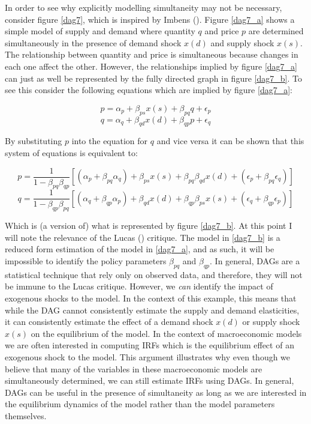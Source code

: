 \documentclass{article}
\begin{document}
In order to see why explicitly modelling simultaneity may not be necessary, consider figure \ref{dag7}, which is inspired by Imbens (\citeyear{imbens2019potential}). Figure \ref{dag7_a} shows a simple model of supply and demand where quantity $q$ and price $p$ are determined simultaneously in the presence of demand shock $x(d)$ and supply shock $x(s)$. The relationship between quantity and price is simultaneous because changes in each one affect the other. However, the relationships implied by figure \ref{dag7_a} can just as well be represented by the fully directed graph in figure \ref{dag7_b}. To see this consider the following equations which are implied by figure \ref{dag7_a}:

\begin{equation}
  p = \alpha_p + \beta_{ps} x(s) + \beta_{pq} q + \epsilon_{p}
\end{equation}
\begin{equation}
  q = \alpha_q + \beta_{qd} x(d) + \beta_{qp} p + \epsilon_{q}
\end{equation}

By substituting $p$ into the equation for $q$ and vice versa it can be shown that this system of equations is equivalent to:

\begin{equation}
  \label{price_eq}
  p = \frac{1}{1-\beta_{pq}\beta_{qp}}[(\alpha_p + \beta_{pq} \alpha_q) + \beta_{ps} x(s) + \beta_{pq} \beta_{qd} x(d) + (\epsilon_p + \beta_{pq} \epsilon_q)]
\end{equation}
\begin{equation}
  \label{quantity_eq}
  q = \frac{1}{1-\beta_{qp}\beta_{pq}}[(\alpha_q + \beta_{qp} \alpha_p) + \beta_{qd} x(d) + \beta_{qp} \beta_{ps} x(s) + (\epsilon_q + \beta_{qp} \epsilon_p)]
\end{equation}

Which is (a version of) what is represented by figure \ref{dag7_b}. At this point I will note the relevance of the Lucas (\citeyear{lucas1976econometric}) critique. The model in \ref{dag7_b} is a reduced form estimation of the model in \ref{dag7_a}, and as such, it will be impossible to identify the policy parameters $\beta_{pq}$ and $\beta_{qp}$. In general, DAGs are a statistical technique that rely only on observed data, and therefore, they will not be immune to the Lucas critique. However, we \textit{can} identify the impact of exogenous shocks to the model. In the context of this example, this means that while the DAG cannot consistently estimate the supply and demand elasticities, it can consistently estimate the effect of a demand shock $x(d)$ or supply shock $x(s)$ on the equilibrium of the model. In the context of macroeconomic models we are often interested in computing IRFs which is the equilibrium effect of an exogenous shock to the model. This argument illustrates why even though we believe that many of the variables in these macroeconomic models are simultaneously determined, we can still estimate IRFs using DAGs. In general, DAGs can be useful in the presence of simultaneity as long as we are interested in the equilibrium dynamics of the model rather than the model parameters themselves.
\end{document}
